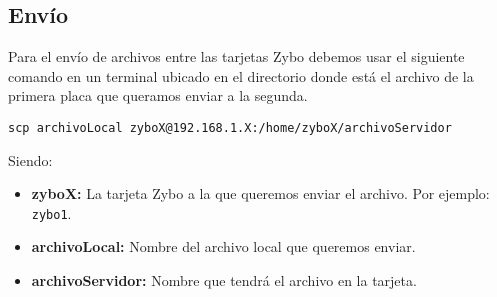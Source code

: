 \documentclass[12pt,letterpaper]{article}
\begin{document}
\subsection{Envío}
Para el envío de archivos entre las tarjetas Zybo debemos usar el siguiente comando en un terminal ubicado en el directorio donde está el archivo de la primera placa que queramos enviar a la segunda.
\begin{center}
	\texttt{scp archivoLocal zyboX@192.168.1.X:/home/zyboX/archivoServidor}
\end{center}
Siendo:
\begin{itemize}
	\item \textbf{zyboX:} La tarjeta Zybo a la que queremos enviar el archivo. Por ejemplo: \texttt{zybo1}.
	\item \textbf{archivoLocal:} Nombre del archivo local que queremos enviar.
	\item \textbf{archivoServidor:} Nombre que tendrá el archivo en la tarjeta.
\end{itemize}
\end{document}
